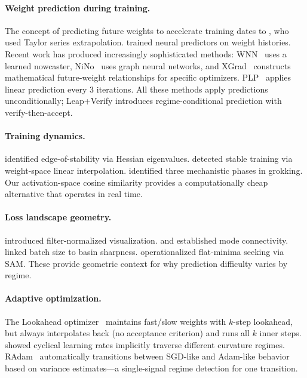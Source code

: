 \documentclass{article}
\begin{document}
\paragraph{Weight prediction during training.}
The concept of predicting future weights to accelerate training dates to \citet{kamarthi1999accelerating}, who used Taylor series extrapolation.
\citet{sinha2017introspection} trained neural predictors on weight histories.
Recent work has produced increasingly sophisticated methods: WNN~\citep{jang2023wnn} uses a learned nowcaster, NiNo~\citep{knyazev2025nino} uses graph neural networks, and XGrad~\citep{guan2024xgrad} constructs mathematical future-weight relationships for specific optimizers.
PLP~\citep{plp2024} applies linear prediction every 3 iterations.
All these methods apply predictions unconditionally; Leap+Verify introduces regime-conditional prediction with verify-then-accept.

\paragraph{Training dynamics.}
\citet{cohen2021gradient} identified edge-of-stability via Hessian eigenvalues.
\citet{frankle2020linear} detected stable training via weight-space linear interpolation.
\citet{nanda2023progress} identified three mechanistic phases in grokking.
Our activation-space cosine similarity provides a computationally cheap alternative that operates in real time.

\paragraph{Loss landscape geometry.}
\citet{li2018visualizing} introduced filter-normalized visualization.
\citet{garipov2018loss} and \citet{draxler2018essentially} established mode connectivity.
\citet{keskar2017large} linked batch size to basin sharpness.
\citet{foret2021sharpness} operationalized flat-minima seeking via SAM.
These provide geometric context for why prediction difficulty varies by regime.

\paragraph{Adaptive optimization.}
The Lookahead optimizer~\citep{zhang2019lookahead} maintains fast/slow weights with $k$-step lookahead, but always interpolates back (no acceptance criterion) and runs all $k$ inner steps.
\citet{smith2017cyclical} showed cyclical learning rates implicitly traverse different curvature regimes.
RAdam~\citep{liu2020variance} automatically transitions between SGD-like and Adam-like behavior based on variance estimates---a single-signal regime detection for one transition.
\end{document}
